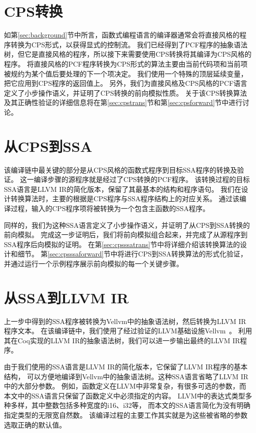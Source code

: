 \section{CPS转换}

如第\ref{sec:background}节中所言，函数式编程语言的编译器通常会将直接风格的程序转换为CPS形式，以获得显式的控制流。
我们已经得到了PCF程序的抽象语法树，但它是直接风格的程序，所以接下来需要使用CPS转换将其编译为CPS风格的程序。
将直接风格的PCF程序转换为CPS形式的算法主要由当前代码项和当前项被规约为某个值后要处理的下一个项决定。
我们使用一个特殊的顶层延续变量，把它应用到CPS程序的返回值上。
另外，我们为直接风格及CPS风格的PCF语言定义了小步操作语义，并证明了CPS转换的前向模拟性质。
关于该CPS转换算法及其正确性验证的详细信息将在第\ref{sec:cpstrans}节和第\ref{sec:cpsforward}节中进行讨论。

\section{从CPS到SSA}

该编译链中最关键的部分是从CPS风格的函数式程序到目标SSA程序的转换及验证。
这一编译步骤的源程序就是经过了CPS转换的PCF程序。
该转换过程的目标SSA语言是LLVM IR的简化版本，保留了其最基本的结构和程序语句。
我们在设计转换算法时，主要的根据是CPS程序与SSA程序结构上的对应关系。
通过该编译过程，输入的CPS程序项将被转换为一个包含主函数的SSA程序。

同样的，我们为这种SSA语言定义了小步操作语义，并证明了从CPS到SSA转换的前向模拟。
完成这一步证明后，我们将前向模拟组合起来，并完成了从源程序到SSA程序后向模拟的证明。
在第\ref{sec:cpsssatrans}节中将详细介绍该转换算法的设计和细节。
第\ref{sec:cpsssaforward}节中将进行CPS到SSA转换算法的形式化验证，并通过运行一个示例程序展示前向模拟的每一个关键步骤。

\section{从SSA到LLVM IR}

上一步中得到的SSA程序被转换为Vellvm中的抽象语法树，然后转换为LLVM IR程序文本。
在该编译链中，我们使用了经过验证的LLVM基础设施Vellvm~\cite{zakowski2021modular}。
利用其在Coq实现的LLVM IR的抽象语法树，我们可以进一步输出最终的LLVM IR程序。

由于我们使用的SSA语言是LLVM IR的简化版本，它保留了LLVM IR程序的基本结构，
可以方便地编译到Vellvm中的抽象语法树。这种SSA语言省略了LLVM IR中的大部分参数。
例如，函数定义在LLVM中非常复杂，有很多可选的参数，而本文中的SSA语言只保留了函数定义中必须指定的内容。
LLVM中的表达式类型多种多样，其中整数包括多种宽度的i16、i32等，
而本文的SSA语言简化为没有明确指定类型的无限宽自然数。
该编译过程的主要工作其实就是为这些被省略的参数选取正确的默认值。

